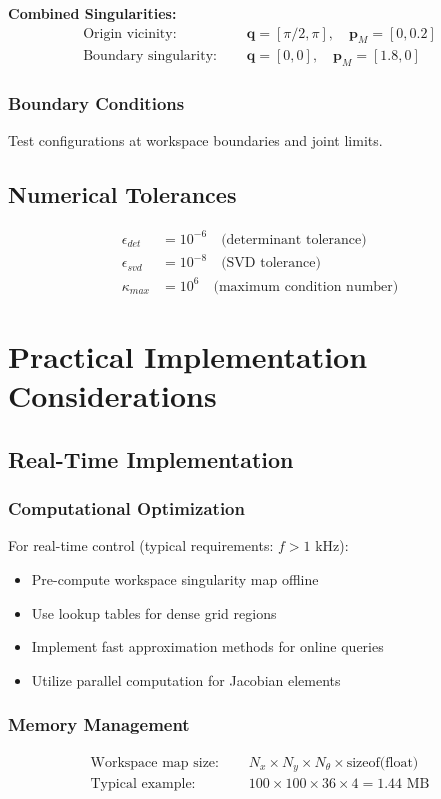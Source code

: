\documentclass[11pt,a4paper]{article}
\begin{document}
\textbf{Combined Singularities:}
\begin{align}
\text{Origin vicinity: } &\quad \bm{q} = [\pi/2, \pi], \quad \bm{p}_M = [0, 0.2] \\
\text{Boundary singularity: } &\quad \bm{q} = [0, 0], \quad \bm{p}_M = [1.8, 0]
\end{align}

\subsubsection{Boundary Conditions}
Test configurations at workspace boundaries and joint limits.

\subsection{Numerical Tolerances}
\begin{align}
\epsilon_{det} &= 10^{-6} \quad \text{(determinant tolerance)} \\
\epsilon_{svd} &= 10^{-8} \quad \text{(SVD tolerance)} \\
\kappa_{max} &= 10^{6} \quad \text{(maximum condition number)}
\end{align}

\section{Practical Implementation Considerations}

\subsection{Real-Time Implementation}

\subsubsection{Computational Optimization}
For real-time control (typical requirements: $f > 1$ kHz):
\begin{itemize}
    \item Pre-compute workspace singularity map offline
    \item Use lookup tables for dense grid regions
    \item Implement fast approximation methods for online queries
    \item Utilize parallel computation for Jacobian elements
\end{itemize}

\subsubsection{Memory Management}
\begin{align}
\text{Workspace map size: } &\quad N_x \times N_y \times N_\theta \times \text{sizeof(float)} \\
\text{Typical example: } &\quad 100 \times 100 \times 36 \times 4 = 1.44 \text{ MB}
\end{align}
\end{document}
